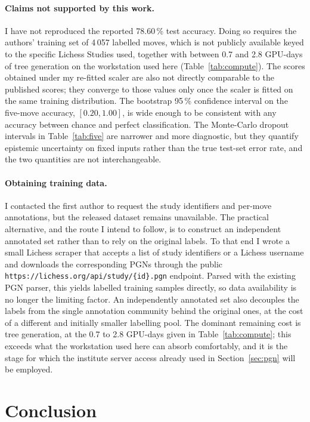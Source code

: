 \documentclass[11pt,a4paper]{article}
\begin{document}
\paragraph{Claims not supported by this work.}
I have not reproduced the reported 78.60\,\% test accuracy. Doing so
requires the authors' training set of 4\,057 labelled moves, which is
not publicly available keyed to the specific Lichess Studies used,
together with between 0.7 and 2.8 GPU-days of tree generation on the
workstation used here (Table~\ref{tab:compute}). The scores obtained under my re-fitted
scaler are also not directly comparable to the published scores; they
converge to those values only once the scaler is fitted on the same
training distribution. The bootstrap 95\,\% confidence interval on the
five-move accuracy, $[0.20, 1.00]$, is wide enough to be consistent
with any accuracy between chance and perfect classification. The
Monte-Carlo dropout intervals in Table~\ref{tab:five} are narrower and
more diagnostic, but they quantify epistemic uncertainty on fixed
inputs rather than the true test-set error rate, and the two quantities
are not interchangeable.

\paragraph{Obtaining training data.}
I contacted the first author to request the study identifiers and
per-move annotations, but the released dataset remains unavailable.
The practical alternative, and the route I intend to follow, is to
construct an independent annotated set rather than to rely on the
original labels. To that end I wrote a small Lichess scraper that
accepts a list of study identifiers or a Lichess username and
downloads the corresponding PGNs through the public
\texttt{https://lichess.org/api/study/\{id\}.pgn} endpoint. Parsed with
the existing PGN parser, this yields labelled training samples
directly, so data availability is no longer the limiting factor. An
independently annotated set also decouples the labels from the single
annotation community behind the original ones, at the cost of a
different and initially smaller labelling pool. The dominant
remaining cost is tree generation, at the
0.7 to 2.8 GPU-days given in Table~\ref{tab:compute}; this exceeds what
the workstation used here can absorb comfortably, and it is the stage
for which the institute server access already used in
Section~\ref{sec:pgn} will be employed.

\section{Conclusion}
\end{document}
